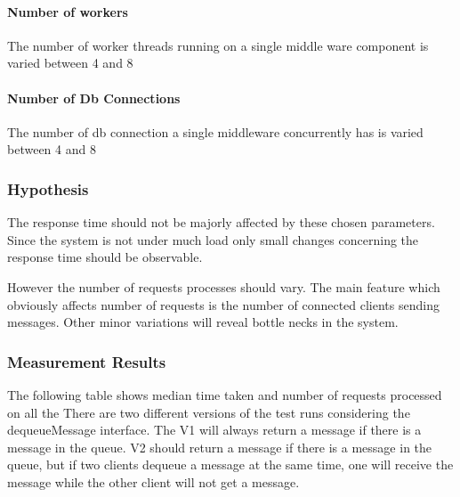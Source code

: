 \documentclass[milestone1.tex]{subfiles}
\begin{document}
\paragraph{Number of workers}

The number of worker threads running on a single middle ware component is varied between 4 and 8

\paragraph{Number of Db Connections}

The number of db connection a single middleware concurrently has is varied between 4 and 8

\subsubsection{Hypothesis}

The response time should not be majorly affected by these chosen parameters. Since the system is not under much load only small changes concerning the response time should be observable.

However the number of requests processes should vary. The main feature which obviously affects number of requests is the number of connected clients sending messages. Other minor variations will reveal bottle necks in the system.

\subsubsection{Measurement Results}
The following table shows median time taken and number of requests processed on all the 
There are two different versions of the test runs considering the dequeueMessage interface. The V1 will always return a message if there is a message in the queue. V2 should return a message if there is a message in the queue, but if two clients dequeue a message at the same time, one will receive the message while the other client will not get a message.\\
\end{document}
